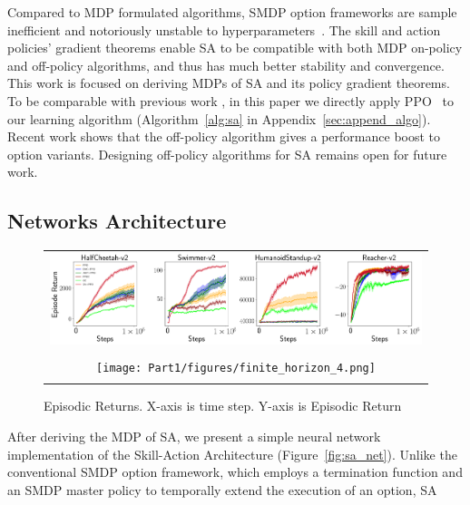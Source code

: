 Compared to MDP formulated algorithms, SMDP option frameworks are
sample inefficient and notoriously unstable to
hyperparameters~\cite{zhang2019dac}. The skill and action
policies' gradient theorems enable SA to be compatible with both
MDP on-policy and off-policy algorithms, and thus has much better
stability and convergence. This work is focused on deriving MDPs
of SA and its policy gradient theorems. To be comparable with
previous work \cite{zhang2019dac}, in this paper we directly
apply PPO~\cite{schulman2017proximal} to our learning algorithm
(Algorithm~\ref{alg:sa} in Appendix~\ref{sec:append_algo}).
Recent work \cite{wulfmeier2020data} shows that the off-policy
algorithm gives a performance boost to option variants. Designing
off-policy algorithms for SA remains open for future work.


\subsection{Networks Architecture}
\label{sec:net_arch}
\begin{figure}[h]
  \centering
  \begin{tabular}{c}
    \includegraphics[width=2\columnwidth]{Part1/figures/infinite_horizon.png}\\
    \vspace{-1mm}{\small (a) Infinite Horizon Environments}\\
    \texttt{[image: Part1/figures/finite\_horizon\_4.png]}\\
    \vspace{-1mm}{\small (b) Finite Horizon Environments}
  \end{tabular}\vspace{-2mm}
  \caption{\label{fig:exp_dac} Episodic Returns. X-axis is time step. Y-axis is
    Episodic Return}
  \vspace{-4mm}
\end{figure}
After deriving the MDP of SA, we present a simple neural network
implementation of the Skill-Action Architecture
(Figure~\ref{fig:sa_net}). Unlike the conventional SMDP option
framework, which employs a termination function and an SMDP
master policy to temporally extend the execution of an option, SA

